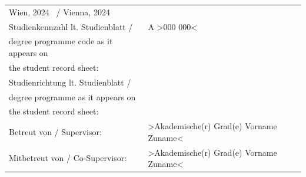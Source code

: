 \begin{titlepage}
\begin{center}
\begin{tabular}{p{8cm}p{11.25cm}}	
		\fontsize{11}{0} \selectfont Wien,  2024 \ / Vienna, 2024 \vspace{2.3cm} &\\  
		\fontsize{10}{0} \selectfont Studienkennzahl lt. Studienblatt / &  \fontsize{10}{0} \selectfont A \textgreater 000 000\textless \\  
    \fontsize{10}{0} \selectfont degree programme code as it appears on & \fontsize{10}{0} \selectfont \\
    \fontsize{10}{0} \selectfont the student record sheet:\vspace*{0.4cm} & \fontsize{10}{0} \selectfont\\
		\fontsize{10}{0} \selectfont Studienrichtung lt. Studienblatt / &  \fontsize{10}{0} \selectfont \\ 
    \fontsize{10}{0} \selectfont degree programme as it appears on & \fontsize{10}{0} \selectfont \\
    \fontsize{10}{0} \selectfont the student record sheet:\vspace*{0.4cm} & \fontsize{10}{0} \selectfont\\
		\fontsize{10}{0} \selectfont Betreut von / Supervisor:\vspace*{0.4cm}& \fontsize{10}{0} \selectfont \textgreater Akademische(r) Grad(e)  Vorname Zuname\textless \\  
		\fontsize{10}{0} \selectfont Mitbetreut von / Co-Supervisor:& \fontsize{10}{0} \selectfont \textgreater Akademische(r) Grad(e)  Vorname Zuname\textless \\  
		
\end{tabular}
\end{center}
\end{titlepage}

\newpage